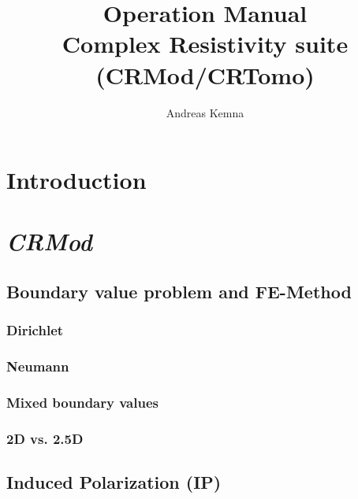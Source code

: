 \documentclass[12pt,a4paper,twoside,titlepage,draft]{book}
\title{Operation Manual \\[.1cm] Complex Resistivity suite \\[.3cm] (CRMod/CRTomo) }
\author{\textcopyright Andreas Kemna}
\newcommand{\crm}{{\it CRMod }}
\theoremstyle{aufgaben}
\theoremstyle{remark}
\newcommand{\mydate}{April 2010}
\begin{document}
\pagestyle{fancy}



\maketitle
\thispagestyle{empty}
\cleardoublepage
{}
\setcounter{page}{1}

\tableofcontents
{}
\listoffigures
{}
\listoftables

\chapter{Introduction} \label{chap:intro}

\chapter{\crm}\label{chap:crmod}
\section{Boundary value problem and FE-Method}\label{sect:crmod_boundary_fe}
\subsection{Dirichlet}\label{sub:crmod_dirichlet}
\subsection{Neumann}\label{sub:crmod_neumann}
\subsection{Mixed boundary values}\label{sub:crmod_mixed}
\subsection{2D vs. 2.5D}\label{sub:crmod_2dvs25d}
\clearpage
\section{Induced Polarization (IP)}\label{sub:crmod_ip}
\end{document}
